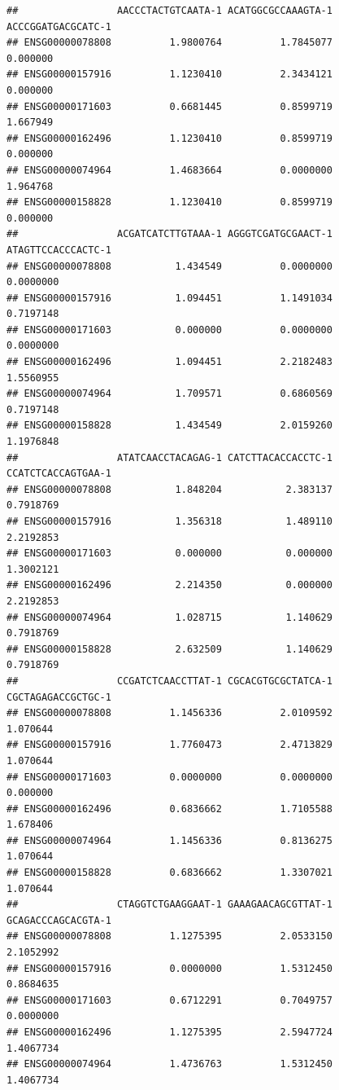 \documentclass[
]{book}
\begin{document}
\begin{verbatim}
##                 AACCCTACTGTCAATA-1 ACATGGCGCCAAAGTA-1 ACCCGGATGACGCATC-1
## ENSG00000078808          1.9800764          1.7845077           0.000000
## ENSG00000157916          1.1230410          2.3434121           0.000000
## ENSG00000171603          0.6681445          0.8599719           1.667949
## ENSG00000162496          1.1230410          0.8599719           0.000000
## ENSG00000074964          1.4683664          0.0000000           1.964768
## ENSG00000158828          1.1230410          0.8599719           0.000000
##                 ACGATCATCTTGTAAA-1 AGGGTCGATGCGAACT-1 ATAGTTCCACCCACTC-1
## ENSG00000078808           1.434549          0.0000000          0.0000000
## ENSG00000157916           1.094451          1.1491034          0.7197148
## ENSG00000171603           0.000000          0.0000000          0.0000000
## ENSG00000162496           1.094451          2.2182483          1.5560955
## ENSG00000074964           1.709571          0.6860569          0.7197148
## ENSG00000158828           1.434549          2.0159260          1.1976848
##                 ATATCAACCTACAGAG-1 CATCTTACACCACCTC-1 CCATCTCACCAGTGAA-1
## ENSG00000078808           1.848204           2.383137          0.7918769
## ENSG00000157916           1.356318           1.489110          2.2192853
## ENSG00000171603           0.000000           0.000000          1.3002121
## ENSG00000162496           2.214350           0.000000          2.2192853
## ENSG00000074964           1.028715           1.140629          0.7918769
## ENSG00000158828           2.632509           1.140629          0.7918769
##                 CCGATCTCAACCTTAT-1 CGCACGTGCGCTATCA-1 CGCTAGAGACCGCTGC-1
## ENSG00000078808          1.1456336          2.0109592           1.070644
## ENSG00000157916          1.7760473          2.4713829           1.070644
## ENSG00000171603          0.0000000          0.0000000           0.000000
## ENSG00000162496          0.6836662          1.7105588           1.678406
## ENSG00000074964          1.1456336          0.8136275           1.070644
## ENSG00000158828          0.6836662          1.3307021           1.070644
##                 CTAGGTCTGAAGGAAT-1 GAAAGAACAGCGTTAT-1 GCAGACCCAGCACGTA-1
## ENSG00000078808          1.1275395          2.0533150          2.1052992
## ENSG00000157916          0.0000000          1.5312450          0.8684635
## ENSG00000171603          0.6712291          0.7049757          0.0000000
## ENSG00000162496          1.1275395          2.5947724          1.4067734
## ENSG00000074964          1.4736763          1.5312450          1.4067734

\end{verbatim}
\end{document}

